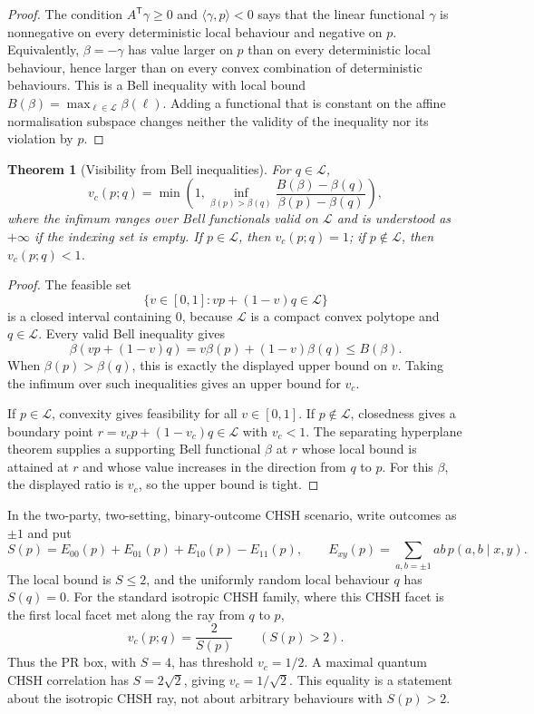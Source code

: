 \documentclass[11pt]{article}
\theoremstyle{plain}
\newtheorem{theorem}{Theorem}[section]
\theoremstyle{definition}
\theoremstyle{remark}
\begin{document}
\begin{proof}
The condition \(A^{\mathsf T}\gamma\ge0\) and \(\langle\gamma,p\rangle<0\) says
that the linear functional \(\gamma\) is nonnegative on every deterministic local
behaviour and negative on \(p\). Equivalently, \(\beta=-\gamma\) has value larger
on \(p\) than on every deterministic local behaviour, hence larger than on every
convex combination of deterministic behaviours. This is a Bell inequality with
local bound \(B(\beta)=\max_{\ell\in\mathcal L}\beta(\ell)\). Adding a functional
that is constant on the affine normalisation subspace changes neither the
validity of the inequality nor its violation by \(p\).
\end{proof}

\begin{theorem}[Visibility from Bell inequalities]
\label{thm:visibility-dual}
For \(q\in\mathcal L\),
\[
v_c(p;q)
=
\min\left(
1,
\inf_{\beta(p)>\beta(q)}
\frac{B(\beta)-\beta(q)}{\beta(p)-\beta(q)}
\right),
\]
where the infimum ranges over Bell functionals valid on \(\mathcal L\) and is
understood as \(+\infty\) if the indexing set is empty. If \(p\in\mathcal L\),
then \(v_c(p;q)=1\); if \(p\notin\mathcal L\), then \(v_c(p;q)<1\).
\end{theorem}

\begin{proof}
The feasible set
\[
\{v\in[0,1]:vp+(1-v)q\in\mathcal L\}
\]
is a closed interval containing \(0\), because \(\mathcal L\) is a compact convex
polytope and \(q\in\mathcal L\). Every valid Bell inequality gives
\[
\beta(vp+(1-v)q)
=v\beta(p)+(1-v)\beta(q)
\le B(\beta).
\]
When \(\beta(p)>\beta(q)\), this is exactly the displayed upper bound on \(v\).
Taking the infimum over such inequalities gives an upper bound for \(v_c\).

If \(p\in\mathcal L\), convexity gives feasibility for all \(v\in[0,1]\). If
\(p\notin\mathcal L\), closedness gives a boundary point
\(r=v_c p+(1-v_c)q\in\mathcal L\) with \(v_c<1\). The separating hyperplane
theorem supplies a supporting Bell functional \(\beta\) at \(r\) whose local bound
is attained at \(r\) and whose value increases in the direction from \(q\) to
\(p\). For this \(\beta\), the displayed ratio is \(v_c\), so the upper bound is
tight.
\end{proof}

\begin{example}
\label{ex:chsh-visibility}
In the two-party, two-setting, binary-outcome CHSH scenario, write outcomes as
\(\pm1\) and put
\[
S(p)=E_{00}(p)+E_{01}(p)+E_{10}(p)-E_{11}(p),
\qquad
E_{xy}(p)=\sum_{a,b=\pm1}ab\,p(a,b\mid x,y).
\]
The local bound is \(S\le2\), and the uniformly random local behaviour \(q\) has
\(S(q)=0\). For the standard isotropic CHSH family, where this CHSH facet is the
first local facet met along the ray from \(q\) to \(p\),
\[
v_c(p;q)=\frac{2}{S(p)}
\qquad(S(p)>2).
\]
Thus the PR box, with \(S=4\), has threshold \(v_c=1/2\). A maximal quantum CHSH
correlation has \(S=2\sqrt2\), giving \(v_c=1/\sqrt2\). This equality is a
statement about the isotropic CHSH ray, not about arbitrary behaviours with
\(S(p)>2\).
\end{example}
\end{document}
